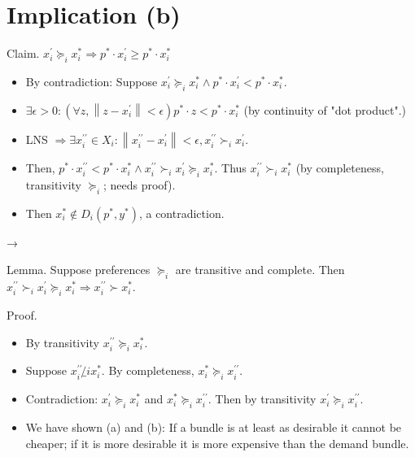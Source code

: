 \documentclass[10pt]{article}
\begin{document}
\section*{Implication (b)}
Claim. $x_{i}^{\prime} \succeq_{i} x_{i}^{*} \Longrightarrow p^{*} \cdot x_{i}^{\prime} \geq p^{*} \cdot x_{i}^{*}$

\begin{itemize}
  \item By contradiction: Suppose $x_{i}^{\prime} \succeq_{i} x_{i}^{*} \wedge p^{*} \cdot x_{i}^{\prime}<p^{*} \cdot x_{i}^{*}$.
  \item $\exists \epsilon>0:\left(\forall z,\left\|z-x_{i}^{\prime}\right\|<\epsilon\right) p^{*} \cdot z<p^{*} \cdot x_{i}^{*}$ (by continuity of "dot product".)
  \item LNS $\Longrightarrow \exists x_{i}^{\prime \prime} \in X_{i}:\left\|x_{i}^{\prime \prime}-x_{i}^{\prime}\right\|<\epsilon, x_{i}^{\prime \prime} \succ_{i} x_{i}^{\prime}$.
  \item Then, $p^{*} \cdot x_{i}^{\prime \prime}<p^{*} \cdot x_{i}^{*} \wedge x_{i}^{\prime \prime} \succ_{i} x_{i}^{\prime} \succeq_{i} x_{i}^{*}$. Thus $x_{i}^{\prime \prime} \succ_{i} x_{i}^{*}$ (by completeness, transitivity $\succeq_{i}$; needs proof).
  \item Then $x_{i}^{*} \notin D_{i}\left(p^{*}, y^{*}\right)$, a contradiction.
\end{itemize}

→

Lemma. Suppose preferences $\succeq_{i}$ are transitive and complete. Then $x_{i}^{\prime \prime} \succ_{i} x_{i}^{\prime} \succeq_{i} x_{i}^{*} \Longrightarrow x_{i}^{\prime \prime} \succ x_{i}^{*}$.

Proof.

\begin{itemize}
  \item By transitivity $x_{i}^{\prime \prime} \succeq_{i} x_{i}^{*}$.
  \item Suppose $x_{i}^{\prime \prime} \not_{i} x_{i}^{*}$. By completeness, $x_{i}^{*} \succeq_{i} x_{i}^{\prime \prime}$.
  \item Contradiction: $x_{i}^{\prime} \succeq_{i} x_{i}^{*}$ and $x_{i}^{*} \succeq_{i} x_{i}^{\prime \prime}$. Then by transitivity $x_{i}^{\prime} \succeq_{i} x_{i}^{\prime \prime}$.
  \item We have shown (a) and (b): If a bundle is at least as desirable it cannot be cheaper; if it is more desirable it is more expensive than the demand bundle.
\end{itemize}
\end{document}
